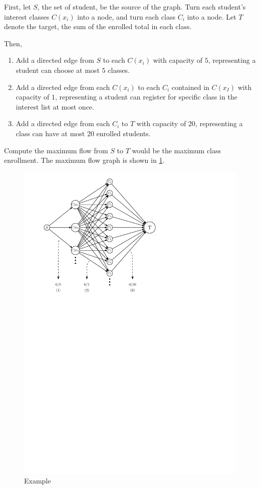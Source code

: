 \documentclass[12pt,letterpaper,titlepage,en-US]{article}
\begin{document}
\begin{homeworkProblem}
    \begin{homeworkSubProblem}
First, let $S$, the set of student, be the source of the graph.
Turn each student's interest classes $C(x_i)$ into a node,
and turn each class $C_i$ into a node.
Let $T$ denote the target, the sum of the enrolled total in each class.

Then,
\begin{enumerate}[label={(\arabic*)},leftmargin=.5in]
    \item Add a directed edge from $S$ to each $C(x_i)$ with capacity of $5$,
        representing a student can choose at most $5$ classes.
    \item Add a directed edge from each $C(x_i)$ to each $C_i$ contained in $C(x_I)$ with capacity of $1$,
        representing a student can register for specific class in the interest list at most once.
    \item Add a directed edge from each $C_i$ to $T$ with capacity of $20$,
        representing a class can have at most 20 enrolled students.
\end{enumerate}

Compute the maximum flow from $S$ to $T$ would be the maximum class enrollment.
The maximum flow graph is shown in \cref{p4a}.

\begin{figure}[H]
    \caption{Example}\label{p4a}
    \centering
    \includegraphics[width=.73\textwidth]{p4a}
\end{figure}



\end{homeworkSubProblem}
\end{homeworkProblem}
\end{document}
